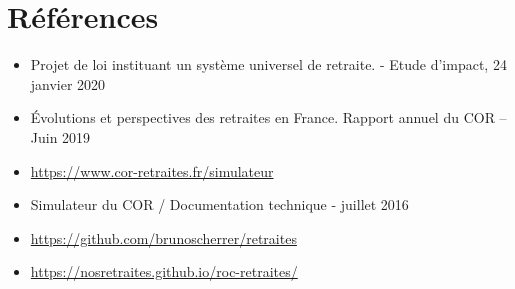\documentclass[10pt]{article}
\begin{document}

\section{Références}

\begin{itemize}
\item Projet de loi instituant un système universel de retraite. - Etude d'impact, 24 janvier 2020
\item Évolutions et perspectives des retraites en France. Rapport annuel du COR – Juin 2019
\item \url{https://www.cor-retraites.fr/simulateur}
\item Simulateur du COR / Documentation technique - juillet 2016
\item \url{https://github.com/brunoscherrer/retraites}
\item \url{https://nosretraites.github.io/roc-retraites/}
\end{itemize}
\end{document}
